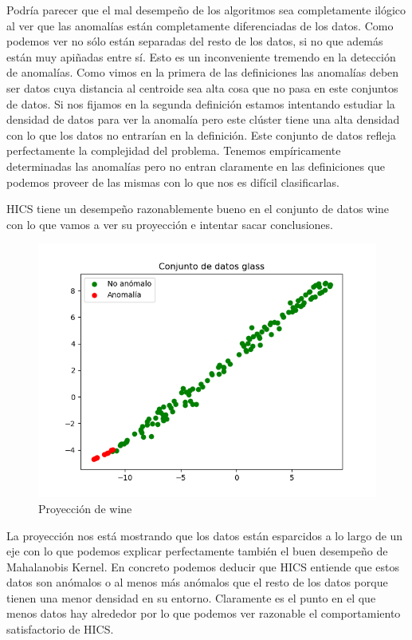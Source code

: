 Podría parecer que el mal desempeño de los algoritmos sea completamente ilógico al ver que las anomalías están completamente diferenciadas de los datos. Como podemos ver no sólo están separadas del resto de los datos, si no que además están muy apiñadas entre sí. Esto es un inconveniente tremendo en la detección de anomalías. Como vimos en la primera de las definiciones las anomalías deben ser datos cuya distancia al centroide sea alta cosa que no pasa en este conjuntos de datos. Si nos fijamos en la segunda definición estamos intentando estudiar la densidad de datos para ver la anomalía pero este clúster tiene una alta densidad con lo que los datos no entrarían en la definición. Este conjunto de datos refleja perfectamente la complejidad del problema. Tenemos empíricamente determinadas las anomalías pero no entran claramente en las definiciones que podemos proveer de las mismas con lo que nos es difícil clasificarlas.

HICS tiene un desempeño razonablemente bueno en el conjunto de datos wine con lo que vamos a ver su proyección e intentar sacar conclusiones.

\begin{figure}[H]
	\centering
	\label{wine}
	\includegraphics[scale=0.7]{imagenes/wine}
	\caption{Proyección de wine}
\end{figure}

La proyección nos está mostrando que los datos están esparcidos a lo largo de un eje con lo que podemos explicar perfectamente también el buen desempeño de Mahalanobis Kernel. En concreto podemos deducir que HICS entiende que estos datos son anómalos o al menos más anómalos que el resto de los datos porque tienen una menor densidad en su entorno. Claramente es el punto en el que menos datos hay alrededor por lo que podemos ver razonable el comportamiento satisfactorio de HICS.

